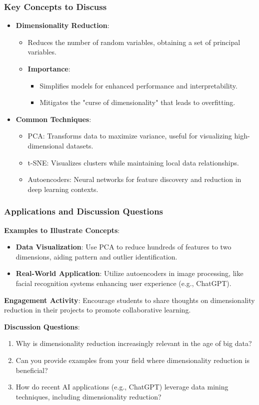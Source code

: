 \documentclass[aspectratio=169]{beamer}
\begin{document}
\begin{frame}[fragile]
    \frametitle{Key Concepts to Discuss}
    \begin{itemize}
        \item \textbf{Dimensionality Reduction}:
        \begin{itemize}
            \item Reduces the number of random variables, obtaining a set of principal variables.
            \item \textbf{Importance}:
            \begin{itemize}
                \item Simplifies models for enhanced performance and interpretability.
                \item Mitigates the "curse of dimensionality" that leads to overfitting.
            \end{itemize}
        \end{itemize}
        
        \item \textbf{Common Techniques}:
        \begin{itemize}
            \item PCA: Transforms data to maximize variance, useful for visualizing high-dimensional datasets.
            \item t-SNE: Visualizes clusters while maintaining local data relationships.
            \item Autoencoders: Neural networks for feature discovery and reduction in deep learning contexts.
        \end{itemize}
    \end{itemize}
\end{frame}

\begin{frame}[fragile]
    \frametitle{Applications and Discussion Questions}
    \textbf{Examples to Illustrate Concepts}:
    \begin{itemize}
        \item \textbf{Data Visualization}: Use PCA to reduce hundreds of features to two dimensions, aiding pattern and outlier identification.
        \item \textbf{Real-World Application}: Utilize autoencoders in image processing, like facial recognition systems enhancing user experience (e.g., ChatGPT).
    \end{itemize}
    
    \textbf{Engagement Activity}:
    Encourage students to share thoughts on dimensionality reduction in their projects to promote collaborative learning.

    \textbf{Discussion Questions}:
    \begin{enumerate}
        \item Why is dimensionality reduction increasingly relevant in the age of big data?
        \item Can you provide examples from your field where dimensionality reduction is beneficial?
        \item How do recent AI applications (e.g., ChatGPT) leverage data mining techniques, including dimensionality reduction?
    \end{enumerate}
\end{frame}
\end{document}
